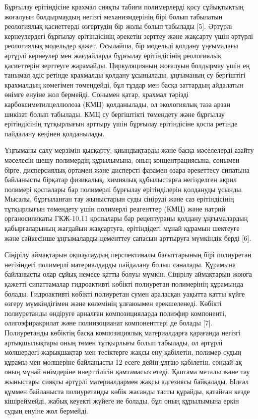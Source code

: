 \begin{multicols}{2}
Бұрғылау ерітіндісіне крахмал сияқты табиғи полимерлерді қосу
сұйықтықтың жоғалуын болдырмаудың негізгі механизмдерінің бірі болып
табылатын реологиялық қасиеттерді өзгертудің бір жолы болып табылады
{[}5{]}. Әртүрлі кернеулердегі бұрғылау ерітіндісінің әрекетін зерттеу
және жақсарту үшін әртүрлі реологиялық модельдер қажет. Осылайша, бір
модельді қолдану ұңғымадағы әртүрлі кернеулер мен жағдайларда бұрғылау
ерітіндісінің реологиялық қасиеттерін зерттеуге жарамайды. Циркуляцияның
жоғалуын болдырмау үшін ең танымал әдіс ретінде крахмалды қолдану
ұсынылады, ұңғыманың су бергіштігі крахмалдың көмегімен төмендейді, бұл
тұздар мен басқа заттардың айдалатын өнімге енуіне жол бермейді. Сонымен
қатар, крахмал тәрізді карбоксиметилцеллюлоза (КМЦ) қолданылады, ол
экологиялық таза арзан шикізат болып табылады. КМЦ су бергіштікті
төмендету және бұрғылау ерітіндісінің тұтқырлығын арттыру үшін бұрғылау
ерітіндісіне қоспа ретінде пайдалану кеңінен қолданылады.

Ұңғыманы салу мерзімін қысқарту, қиындықтарды және басқа мәселелерді
азайту мәселесін шешу полимердің құрылымына, оның концентрациясына,
сонымен бірге, дисперсиялық ортамен және дисперсті фазамен өзара
әрекеттесу сипатына байланысты бірқатар физикалық, химиялық құбылыстарға
негізделген акрил полимері қоспалары бар полимерлі бұрғылау
ерітінділерін қолдануды ұсынды. Мысалы, бұрғыланған тау жыныстарын суды
сіңіруді және саз ерітіндісінің тұтқырлығын төмендету үшін полимерлі
реагенттер (КМЦ) және натрий органосиликаты ГКЖ-10,11 қоспалары бар
рецептураны қолдану ұңғымалардың қабырғаларының жағдайын жақсартуға,
ерітіндідегі мұнай құрамын шектеуге және сәйкесінше ұңғымаларды
цементтеу сапасын арттыруға мүмкіндік берді {[}6{]}.

Сіңірілу аймақтарын оқшаулаудың перспективалы бағыттарының бірі
полиуретан негізіндегі полимерлі материалдарды пайдалану болып саналады.
Құрамына байланысты олар сұйық немесе қатты болуы мүмкін. Сіңірілу
аймақтарын жоюға қажетті сипаттамалар гидроактивті көбікті полиуретан
полимерінің құрамында болады. Гидроактивті көбікті полиуретан сумен
араласқан уақытта қатты күйге өзгеру мүмкіндігімен және көлемінің
ұлғаюымен ерекшеленеді. Көбікті полиуретанды өндіруге арналған
композицияларда полиэфир компоненті, олигоэфиракрилат және полиизоцианат
компоненттері де болады {[}7{]}. Полиуретанды көбіктің басқа
композициялық материалдарға қарағанда негізгі артықшылықтары оның төмен
тұтқырлығы болып табылады, ол әртүрлі мөлшердегі жарықшақтар мен
тесіктерге жақсы ену қабілетін, полимер судың құрамы мен мөлшеріне
байланысты 12 есеге дейін ұлғаю қабілетін, сондай-ақ оның мұнай
өнімдеріне инерттілігін қамтамасыз етеді. Қаптама металы және тау
жыныстары сияқты әртүрлі материалдармен жақсы адгезиясы байқалады. Ылғал
құммен байланыста полиуретанды көбік жасанды тасты құрайды, қатайған
кезде кішіреймейді, жабық кеуекті жүйеге ие болады, бұл оның құрылымына
еркін судың енуіне жол бермейді.


\end{multicols}
